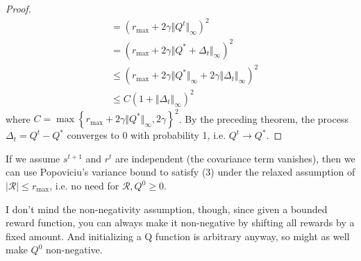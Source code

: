 \documentclass[twoside,10pt]{report}
\begin{document}
\begin{proof}
\begin{align*}
		&= ( r_{\text{max}} + 2 \gamma {\Vert{Q^{t}}\Vert}_{\infty})^2 \\
		&= (r_{\text{max}} + 2 \gamma {\Vert{Q^{*} + \Delta_{t}}\Vert}_{\infty})^2 \\
		&\leq \left( r_{\text{max}} + 2\gamma {\Vert{Q^{*}}\Vert}_{\infty} + 2\gamma {\Vert{\Delta_{t}}\Vert}_{\infty} \right)^2 \\
		&\leq C (1 + {\Vert{\Delta_{t}}\Vert}_{\infty})^2
	\end{align*}
where $C = \max\left\{ r_{\text{max}} + 2 \gamma {\Vert{Q^{*}}\Vert}_{\infty}, 2 \gamma \right\}^2$. By the preceding theorem, the process $\Delta_{t} = Q^{t} - Q^{*}$ converges to 0 with probability 1, i.e. $Q^{t} \to Q^{*}$.
\end{proof}

\begin{note}[]
If we assume $s^{t+1}$ and $r^{t}$ are independent (the covariance term vanishes), then we can use Popoviciu's variance bound to satisfy (3) under the relaxed assumption of $|\mathcal{R}| \leq r_{\text{max}}$, i.e. no need for $\mathcal{R}, Q^{0} \geq 0$.

I don't mind the non-negativity assumption, though, since given a bounded reward function, you can always make it non-negative by shifting all rewards by a fixed amount. And initializing a Q function is arbitrary anyway, so might as well make $Q^{0}$ non-negative.
\end{note}
\end{document}
